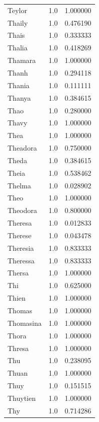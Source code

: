 \documentclass[
  letterpaper,
  DIV=11,
  numbers=noendperiod]{scrreprt}
\begin{document}
\begin{tabular}{lrr}
Teylor          &   1.0 &   1.000000 \\
Thaily          &   1.0 &   0.476190 \\
Thais           &   1.0 &   0.333333 \\
Thalia          &   1.0 &   0.418269 \\
Thamara         &   1.0 &   1.000000 \\
Thanh           &   1.0 &   0.294118 \\
Thania          &   1.0 &   0.111111 \\
Thanya          &   1.0 &   0.384615 \\
Thao            &   1.0 &   0.280000 \\
Thavy           &   1.0 &   1.000000 \\
Thea            &   1.0 &   1.000000 \\
Theadora        &   1.0 &   0.750000 \\
Theda           &   1.0 &   0.384615 \\
Theia           &   1.0 &   0.538462 \\
Thelma          &   1.0 &   0.028902 \\
Theo            &   1.0 &   1.000000 \\
Theodora        &   1.0 &   0.800000 \\
Theresa         &   1.0 &   0.012833 \\
Therese         &   1.0 &   0.043478 \\
Theresia        &   1.0 &   0.833333 \\
Theressa        &   1.0 &   0.833333 \\
Thersa          &   1.0 &   1.000000 \\
Thi             &   1.0 &   0.625000 \\
Thien           &   1.0 &   1.000000 \\
Thomas          &   1.0 &   1.000000 \\
Thomasina       &   1.0 &   1.000000 \\
Thora           &   1.0 &   1.000000 \\
Thresa          &   1.0 &   1.000000 \\
Thu             &   1.0 &   0.238095 \\
Thuan           &   1.0 &   1.000000 \\
Thuy            &   1.0 &   0.151515 \\
Thuytien        &   1.0 &   1.000000 \\
Thy             &   1.0 &   0.714286 \\

\end{tabular}
\end{document}
